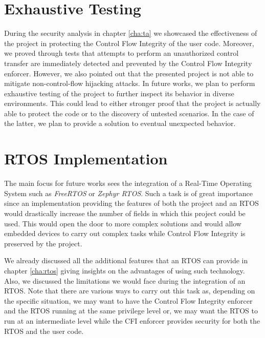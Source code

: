 \section{Exhaustive Testing}
\label{sec:future_testing}

During the security analysis in chapter \ref{cha:ta} we showcased the effectiveness
of the project in protecting the Control Flow Integrity of the user code.
Moreover, we proved through tests that attempts to perform an unauthorized control
transfer are immediately detected and prevented by the Control Flow Integrity enforcer.
However, we also pointed out that the presented project is not able to mitigate non-control-flow
hijacking attacks. In future works, we plan to perform exhaustive testing of the
project to further inspect its behavior in diverse environments. This could lead
to either stronger proof that the project is actually able to protect the code
or to the discovery of untested scenarios. In the case of the latter, we plan to
provide a solution to eventual unexpected behavior.

\section{RTOS Implementation}
\label{sec:future_rtos}

The main focus for future works sees the integration of a Real-Time Operating System
such as \textit{FreeRTOS} or \textit{Zephyr RTOS}. Such a task is of great
importance since an implementation providing the features of both the project
and an RTOS would drastically increase the number of fields in which this
project could be used. This would open the door to more complex solutions and would
allow embedded devices to carry out complex tasks while Control Flow Integrity is
preserved by the project.

We already discussed all the additional features that an RTOS can provide in chapter
\ref{cha:rtos} giving insights on the advantages of using such technology. Also,
we discussed the limitations we would face during the integration of an RTOS.
Note that there are various ways to carry out this task as, depending on the specific
situation, we may want to have the Control Flow Integrity enforcer and the RTOS
running at the same privilege level or, we may want the RTOS to run at an intermediate
level while the CFI enforcer provides security for both the RTOS and the user code.

